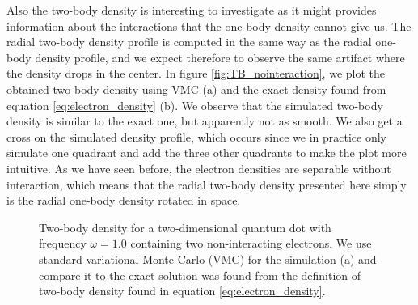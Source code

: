 Also the two-body density is interesting to investigate as it might provides information about the interactions that the one-body density cannot give us. The radial two-body density profile is computed in the same way as the radial one-body density profile, and we expect therefore to observe the same artifact where the density drops in the center. In figure \eqref{fig:TB_nointeraction}, we plot the obtained two-body density using VMC (a) and the exact density found from equation \eqref{eq:electron_density} (b). We observe that the simulated two-body density is similar to the exact one, but apparently not as smooth. We also get a cross on the simulated density profile, which occurs since we in practice only simulate one quadrant and add the three other quadrants to make the plot more intuitive. As we have seen before, the electron densities are separable without interaction, which means that the radial two-body density presented here simply is the radial one-body density rotated in space. 

\begin{figure}
	\centering
	\caption{Two-body density for a two-dimensional quantum dot with frequency $\omega=1.0$ containing two non-interacting electrons. We use standard variational Monte Carlo (VMC) for the simulation (a) and compare it to the exact solution was found from the definition of two-body density found in equation \eqref{eq:electron_density}.}%
	\label{fig:TB_nointeraction}
\end{figure}

